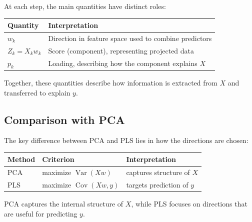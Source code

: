 \documentclass[
  letterpaper,
  DIV=11,
  numbers=noendperiod]{scrreprt}
\newcounter{none} %
\theoremstyle{definition}
\theoremstyle{definition}
\theoremstyle{plain}
\theoremstyle{plain}
\theoremstyle{remark}
\begin{document}
At each step, the main quantities have distinct roles:

{\def\LTcaptype{none} %
\begin{longtable}[]{@{}ll@{}}
\toprule\noalign{}
Quantity & Interpretation \\
\midrule\noalign{}
\endhead
\bottomrule\noalign{}
\endlastfoot
\(w_k\) & Direction in feature space used to combine predictors \\
\(Z_k = X_k w_k\) & Score (component), representing projected data \\
\(p_k\) & Loading, describing how the component explains \(X\) \\
\end{longtable}
}

Together, these quantities describe how information is extracted from
\(X\) and transferred to explain \(y\).

\subsection{Comparison with PCA}\label{comparison-with-pca}

The key difference between PCA and PLS lies in how the directions are
chosen:

{\def\LTcaptype{none} %
\begin{longtable}[]{@{}
  >{\raggedright\arraybackslash}p{}
  >{\raggedright\arraybackslash}p{}
  >{\raggedright\arraybackslash}p{}@{}}
\toprule\noalign{}
\begin{minipage}[b]{\linewidth}\raggedright
Method
\end{minipage} & \begin{minipage}[b]{\linewidth}\raggedright
Criterion
\end{minipage} & \begin{minipage}[b]{\linewidth}\raggedright
Interpretation
\end{minipage} \\
\midrule\noalign{}
\endhead
\bottomrule\noalign{}
\endlastfoot
PCA & maximize \(\operatorname{Var}(Xw)\) & captures structure of
\(X\) \\
PLS & maximize \(\operatorname{Cov}(Xw, y)\) & targets prediction of
\(y\) \\
\end{longtable}
}

PCA captures the internal structure of \(X\), while PLS focuses on
directions that are useful for predicting \(y\).
\end{document}
